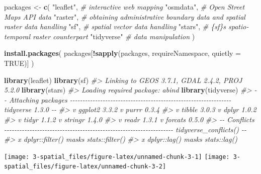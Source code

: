 \documentclass[
]{report}
\newenvironment{Shaded}{\begin{snugshade}}{\end{snugshade}}
\newcommand{\CommentTok}[1]{\textcolor[rgb]{0.56,0.35,0.01}{\textit{#1}}}
\newcommand{\DataTypeTok}[1]{\textcolor[rgb]{0.13,0.29,0.53}{#1}}
\newcommand{\KeywordTok}[1]{\textcolor[rgb]{0.13,0.29,0.53}{\textbf{#1}}}
\newcommand{\NormalTok}[1]{#1}
\newcommand{\OperatorTok}[1]{\textcolor[rgb]{0.81,0.36,0.00}{\textbf{#1}}}
\newcommand{\OtherTok}[1]{\textcolor[rgb]{0.56,0.35,0.01}{#1}}
\newcommand{\StringTok}[1]{\textcolor[rgb]{0.31,0.60,0.02}{#1}}
\begin{document}
\begin{Shaded}
\begin{Highlighting}[]
\NormalTok{packages \textless{}{-}}\StringTok{ }\KeywordTok{c}\NormalTok{(}
  \StringTok{"leaflet"}\NormalTok{,  }\CommentTok{\# interactive web mapping}
  \StringTok{"osmdata"}\NormalTok{,  }\CommentTok{\# Open Street Maps API data}
  \StringTok{"raster"}\NormalTok{,   }\CommentTok{\# obtaining administrative boundary data and spatial raster data handling}
  \StringTok{"sf"}\NormalTok{,       }\CommentTok{\# spatial vector data handling}
  \StringTok{"stars"}\NormalTok{,    }\CommentTok{\# \{sf\}\textquotesingle{}s spatio{-}temporal raster counterpart}
  \StringTok{"tidyverse"} \CommentTok{\# data manipulation}
\NormalTok{)}

\KeywordTok{install.packages}\NormalTok{(}
\NormalTok{  packages[}\OperatorTok{!}\KeywordTok{sapply}\NormalTok{(packages, requireNamespace, }\DataTypeTok{quietly =} \OtherTok{TRUE}\NormalTok{)]}
\NormalTok{)}

\KeywordTok{library}\NormalTok{(leaflet)}
\KeywordTok{library}\NormalTok{(sf)}
\CommentTok{\#\textgreater{} Linking to GEOS 3.7.1, GDAL 2.4.2, PROJ 5.2.0}
\KeywordTok{library}\NormalTok{(stars)}
\CommentTok{\#\textgreater{} Loading required package: abind}
\KeywordTok{library}\NormalTok{(tidyverse)}
\CommentTok{\#\textgreater{} {-}{-} Attaching packages {-}{-}{-}{-}{-}{-}{-}{-}{-}{-}{-}{-}{-}{-}{-}{-}{-}{-}{-}{-}{-}{-}{-}{-}{-}{-}{-}{-}{-}{-}{-}{-}{-}{-}{-}{-}{-}{-}{-}{-}{-}{-}{-}{-}{-}{-}{-}{-}{-}{-}{-}{-}{-}{-}{-}{-}{-}{-}{-}{-}{-}{-}{-}{-} tidyverse 1.3.0 {-}{-}}
\CommentTok{\#\textgreater{} v ggplot2 3.3.2     v purrr   0.3.4}
\CommentTok{\#\textgreater{} v tibble  3.0.3     v dplyr   1.0.2}
\CommentTok{\#\textgreater{} v tidyr   1.1.2     v stringr 1.4.0}
\CommentTok{\#\textgreater{} v readr   1.3.1     v forcats 0.5.0}
\CommentTok{\#\textgreater{} {-}{-} Conflicts {-}{-}{-}{-}{-}{-}{-}{-}{-}{-}{-}{-}{-}{-}{-}{-}{-}{-}{-}{-}{-}{-}{-}{-}{-}{-}{-}{-}{-}{-}{-}{-}{-}{-}{-}{-}{-}{-}{-}{-}{-}{-}{-}{-}{-}{-}{-}{-}{-}{-}{-}{-}{-}{-}{-}{-}{-}{-}{-}{-}{-}{-}{-}{-}{-}{-}{-} tidyverse\_conflicts() {-}{-}}
\CommentTok{\#\textgreater{} x dplyr::filter() masks stats::filter()}
\CommentTok{\#\textgreater{} x dplyr::lag()    masks stats::lag()}
\end{Highlighting}
\end{Shaded}

\begin{center}\texttt{[image: 3-spatial\_files/figure-latex/unnamed-chunk-3-1]} \texttt{[image: 3-spatial\_files/figure-latex/unnamed-chunk-3-2]} \end{center}
\end{document}
